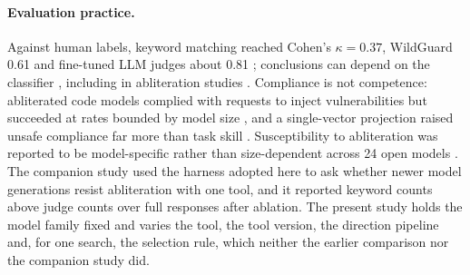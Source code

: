 \paragraph{Evaluation practice.} Against human labels, keyword matching reached Cohen's $\kappa=0.37$, WildGuard
0.61 and fine-tuned LLM judges about 0.81 \cite{xie2025sorrybench}; conclusions can depend on the classifier
\cite{young2026measuring}, including in abliteration studies \cite{agnihotri2025granular}. Compliance is not
competence: abliterated code models complied with requests to inject vulnerabilities but succeeded at rates bounded by model
size \cite{carleo2026willing}, and a single-vector projection raised unsafe compliance far more than task skill
\cite{david2026ablating}. Susceptibility to abliteration was reported to be model-specific rather than size-dependent across
24 open models \cite{hadetskyi2026not}. The companion study \cite{young2026harder} used the harness adopted here to
ask whether newer model generations resist abliteration with one tool, and it reported keyword counts above judge
counts over full responses after ablation. The present study holds the model family fixed and varies the tool, the tool version, the
direction pipeline and, for one search, the selection rule, which neither the earlier comparison nor the companion
study did.
